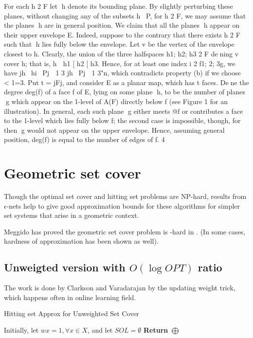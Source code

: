 \documentclass[11pt]{article}
\begin{document}
	
For each h 2 F let h denote its bounding plane. By slightly perturbing these planes,
without changing any of the subsets h \ P, for h 2 F, we may assume that the planes h are in general
position. We claim that all the planes h appear on their upper envelope E. Indeed, suppose to the
contrary that there exists h 2 F such that h lies fully below the envelope. Let v be the vertex of the
envelope closest to h. Clearly, the union of the three halfspaces h1; h2; h3 2 F dening v cover h; that
is, h  h1 [ h2 [ h3. Hence, for at least one index i 2 f1; 2; 3g, we have jh \ hi \ Pj  1
3 jh \ Pj  1
3"n,
which contradicts property (b) if we choose  < 1=3.
Put t = jFj, and consider E as a planar map, which has t faces. Dene the degree deg(f) of a face
f of E, lying on some plane h, to be the number of planes g which appear on the 1-level of A(F)
directly below f (see Figure 1 for an illustration). In general, each such plane g either meets @f or
contributes a face to the 1-level which lies fully below f; the second case is impossible, though, for then
g would not appear on the upper envelope. Hence, assuming general position, deg(f) is equal to the
number of edges of f.
4

\cite{har2014epsilon}



\section{Geometric set cover}

Though the optimal set cover and hitting set
problems are NP-hard, results from $\epsilon$-nets help to give good approximation bounds for these algorithms for
simpler set systems that arise in a geometric context. 

Meggido has proved the geometric set cover problem is \NP-hard in \cite{megiddo1984complexity}. (In some cases, hardness of approximation has been shown as well).

\subsection{Unweigted version with $O(\log OPT)$ ratio}
The work is done by Clarkson and Varadarajan \cite{clarkson2007improved} by the updating weight trick, 
	which happens often in online learning field. 
	
\begin{algorithm}[h]
	\caption{Hitting set Approx for Unweighted Set Cover}
	\label{alg-set-cover-unweighted}
	Initially, let $w{x} = 1,\forall x\in X$, and let $SOL=\emptyset$\;
	{\bf Return} $\bigoplus$\;

\end{algorithm}
\cite{har2012weighted}
\end{document}
